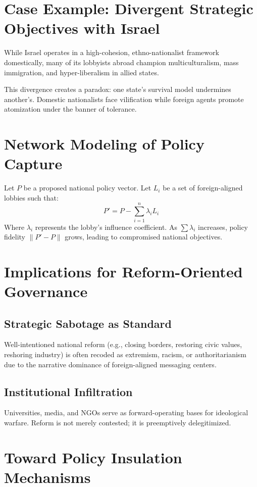\documentclass[11pt]{article}
\begin{document}
\section{Case Example: Divergent Strategic Objectives with Israel}
While Israel operates in a high-cohesion, ethno-nationalist framework domestically, many of its lobbyists abroad champion multiculturalism, mass immigration, and hyper-liberalism in allied states.

This divergence creates a paradox: one state's survival model undermines another's. Domestic nationalists face vilification while foreign agents promote atomization under the banner of tolerance.

\section{Network Modeling of Policy Capture}
Let $P$ be a proposed national policy vector. Let $L_i$ be a set of foreign-aligned lobbies such that:
\begin{equation}
P' = P - \sum_{i=1}^{n} \lambda_i L_i
\end{equation}
Where $\lambda_i$ represents the lobby’s influence coefficient. As $\sum \lambda_i$ increases, policy fidelity $\|P' - P\|$ grows, leading to compromised national objectives.

\section{Implications for Reform-Oriented Governance}
\subsection{Strategic Sabotage as Standard}
Well-intentioned national reform (e.g., closing borders, restoring civic values, reshoring industry) is often recoded as extremism, racism, or authoritarianism due to the narrative dominance of foreign-aligned messaging centers.

\subsection{Institutional Infiltration}
Universities, media, and NGOs serve as forward-operating bases for ideological warfare. Reform is not merely contested; it is preemptively delegitimized.

\section{Toward Policy Insulation Mechanisms}
\end{document}
